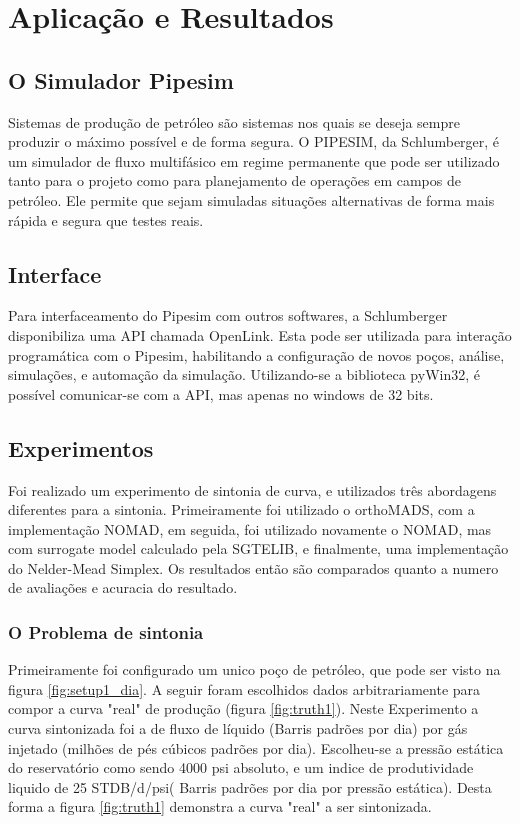 
\chapter{Aplicação e Resultados} \label{chap:4}


\section{O Simulador Pipesim}
Sistemas de produção de petróleo são sistemas nos quais se deseja sempre produzir o máximo possível e de forma segura.
O PIPESIM, da Schlumberger, é um simulador de fluxo multifásico em regime permanente que pode ser utilizado tanto para o projeto como para planejamento de operações em campos de petróleo. Ele permite que sejam simuladas situações alternativas de forma mais rápida e segura que testes reais.

\section{Interface}
Para interfaceamento do Pipesim com outros softwares, a Schlumberger disponibiliza uma API chamada OpenLink. Esta pode ser utilizada para interação programática com o Pipesim, habilitando a configuração de novos poços, análise, simulações, e automação da simulação. Utilizando-se a biblioteca pyWin32, é possível comunicar-se com a API, mas apenas no windows de 32 bits.

\section{Experimentos}
Foi realizado um experimento de sintonia de curva, e utilizados três abordagens diferentes para a sintonia. Primeiramente foi utilizado o orthoMADS, com a implementação NOMAD, em seguida, foi utilizado novamente o NOMAD, mas com surrogate model calculado pela SGTELIB, e finalmente, uma implementação do Nelder-Mead Simplex. Os resultados então são comparados quanto a numero de avaliações e acuracia do resultado.

\subsection{O Problema de sintonia}
Primeiramente foi configurado um unico poço de petróleo, que pode ser visto na figura \ref{fig:setup1_dia}. A seguir foram escolhidos dados arbitrariamente para compor a curva "real" de produção (figura \ref{fig:truth1}).
Neste Experimento a curva sintonizada foi a de fluxo de líquido (Barris padrões por dia) por gás injetado (milhões de pés cúbicos padrões por dia). Escolheu-se a pressão estática do reservatório como sendo 4000 psi absoluto, e um indice de produtividade liquido de 25 STDB/d/psi( Barris padrões por dia por pressão estática). Desta forma a figura \ref{fig:truth1} demonstra a curva "real" a ser sintonizada.




